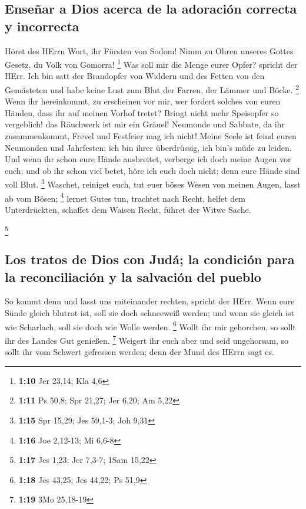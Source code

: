 \hypertarget{enseuxf1ar-a-dios-acerca-de-la-adoraciuxf3n-correcta-y-incorrecta}{%
\subsection{Enseñar a Dios acerca de la adoración correcta y
incorrecta}\label{enseuxf1ar-a-dios-acerca-de-la-adoraciuxf3n-correcta-y-incorrecta}}

 Höret des HErrn Wort, ihr Fürsten von Sodom! Nimm zu
Ohren unseres Gottes Gesetz, du Volk von Gomorra! \footnote{\textbf{1:10}
  Jer 23,14; Kla 4,6}  Was soll mir die Menge eurer
Opfer? spricht der HErr. Ich bin satt der Brandopfer von Widdern und des
Fetten von den Gemästeten und habe keine Lust zum Blut der Farren, der
Lämmer und Böcke. \footnote{\textbf{1:11} Ps 50,8; Spr 21,27; Jer 6,20;
  Am 5,22}  Wenn ihr hereinkommt, zu erscheinen vor mir,
wer fordert solches von euren Händen, dass ihr auf meinen Vorhof tretet?
 Bringt nicht mehr Speisopfer so vergeblich! das
Räuchwerk ist mir ein Gräuel! Neumonde und Sabbate, da ihr
zusammenkommt, Frevel und Festfeier mag ich nicht!  Meine
Seele ist feind euren Neumonden und Jahrfesten; ich bin ihrer
überdrüssig, ich bin's müde zu leiden.  Und wenn ihr
schon eure Hände ausbreitet, verberge ich doch meine Augen vor euch; und
ob ihr schon viel betet, höre ich euch doch nicht; denn eure Hände sind
voll Blut. \footnote{\textbf{1:15} Spr 15,29; Jes 59,1-3; Joh 9,31}
 Waschet, reiniget euch, tut euer böses Wesen von meinen
Augen, lasst ab vom Bösen; \footnote{\textbf{1:16} Joe 2,12-13; Mi 6,6-8}
 lernet Gutes tun, trachtet nach Recht, helfet dem
Unterdrückten, schaffet dem Waisen Recht, führet der Witwe Sache.

\footnote{\textbf{1:17} Jes 1,23; Jer 7,3-7; 1Sam 15,22}

\hypertarget{los-tratos-de-dios-con-juduxe1-la-condiciuxf3n-para-la-reconciliaciuxf3n-y-la-salvaciuxf3n-del-pueblo}{%
\subsection{Los tratos de Dios con Judá; la condición para la
reconciliación y la salvación del
pueblo}\label{los-tratos-de-dios-con-juduxe1-la-condiciuxf3n-para-la-reconciliaciuxf3n-y-la-salvaciuxf3n-del-pueblo}}

 So kommt denn und lasst uns miteinander rechten, spricht
der HErr. Wenn eure Sünde gleich blutrot ist, soll sie doch schneeweiß
werden; und wenn sie gleich ist wie Scharlach, soll sie doch wie Wolle
werden. \footnote{\textbf{1:18} Jes 43,25; Jes 44,22; Ps 51,9}
 Wollt ihr mir gehorchen, so sollt ihr des Landes Gut
genießen. \footnote{\textbf{1:19} 3Mo 25,18-19}  Weigert
ihr euch aber und seid ungehorsam, so sollt ihr vom Schwert gefressen
werden; denn der Mund des HErrn sagt es.

